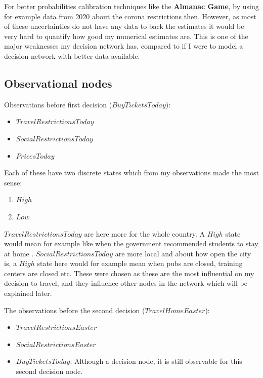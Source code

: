 \documentclass[11pt, a4paper, english]{../Template/NTNUoving}
\begin{document}
\begin{oppgave}
    For better probabilities calibration techniques like the \textbf{Almanac Game}, by using for example data
    from 2020 about the corona restrictions then. However, as most of these uncertainties do not have any data to back the estimates
    it would be very hard to quantify how good my numerical estimates are. This is one of the major weaknesses my decision network has, compared
    to if I were to model a decision network with better data available.

    \subsection{Observational nodes}

    Observations before first decision ($BuyTicketsToday$):
    \begin{itemize}
        \item $TravelRestrictionsToday$
        \item $SocialRestrictionsToday$
        \item $PricesToday$
    \end{itemize}

    Each of these have two discrete states which from my observations made the most sense:
    \begin{enumerate}
        \item $High$
        \item $Low$
    \end{enumerate}

    $TravelRestrictionsToday$ are here more for the whole country. A $High$ state would mean for example like when the government recommended students to stay at home \cite{vg}.
    $SocialRestrictionsToday$ are more local and about how open the city is, a $High$ state here would for example mean when pubs are closed, training centers are closed etc.
    These were chosen as these are the most influential on my decision to travel, and they influence other nodes in the network which will be explained later.

    The observations before the second decision ($TravelHomeEaster$):
    \begin{itemize}
        \item $TravelRestrictionsEaster$
        \item $SocialRestrictionsEaster$
        \item $BuyTicketsToday$: Although a decision node, it is still observable for this second decision node.
    \end{itemize}


\end{oppgave}
\end{document}
